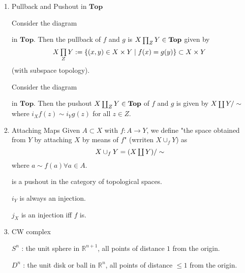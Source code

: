 \documentclass{ctexart}
\DeclareMathOperator{\pullback}{\mathsmaller{\prod}}
\DeclareMathOperator{\pushout}{\mathsmaller{\coprod}}
\newcommand{\Top}{\mathbf{Top}}
\begin{document}
\noindent\makebox[\linewidth]{\rule{\paperwidth}{0.4pt}}

\begin{enumerate}
\item Pullback and Pushout in $\Top$

Consider the diagram
\begin{center}
\end{center}
in $\Top$. Then the pullback of $f$ and $g$ is $X \pullback_Z Y \in \Top$ given by
\[
X \pullback_{Z} Y := \{(x,y) \in X \times Y \mid f(x) = g(y)\} \subset X \times Y
\]
(with subspace topology).

Consider the diagram
\begin{center}
\end{center}
in $\Top$. Then the pushout $X \pushout_Z Y\in \Top$ of $f$ and $g$ is given by $X\pushout Y/\sim$ where $i_X f(z) \sim i_Y g(z)$ for all $z \in Z$.

\item Attaching Maps
Given $A\subset X$ with $f : A\to Y$, we define "the space obtained from $Y$ by attaching $X$ by means of $f$" (wrriten $X \cup_f Y$) as
\[
X\cup_f Y = (X\pushout Y)/\sim
\]
where $a\sim f(a)\forall a\in A$.
\begin{center}
\end{center}
is a pushout in the category of topological spaces.

$i_Y$ is always an injection.

$j_X$ is an injection iff $f$ is.

\item CW complex

$S^n$ : the unit sphere in $\mathbb{R}^{n+1}$, all points of distance $1$ from the origin.

$D^n$ : the unit disk or ball in $\mathbb{R}^n$, all points of distance $\leq 1$ from the origin.


\end{enumerate}
\end{document}
